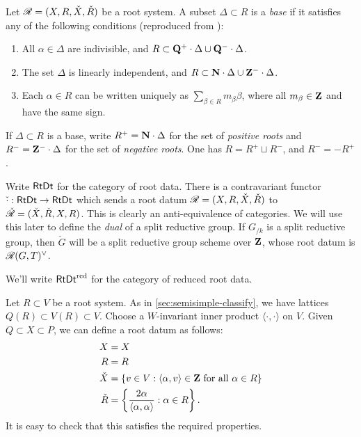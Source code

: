 \begin{definition}
Let $\mathscr{R}=(X,R,\check X,\check R)$ be a root system. A subset $\Delta\subset R$ 
is a \emph{base} if it satisfies any of the following conditions (reproduced 
from \cite[XXI 3.1.5]{sga3-iii}):
\begin{enumerate}
  \item All $\alpha\in \Delta$ are indivisible, and 
    $R\subset \mathbf{Q}^+\cdot\Delta\cup \mathbf{Q}^-\cdot\Delta$. 
  \item The set $\Delta$ is linearly independent, and 
    $R\subset \mathbf{N}\cdot \Delta\cup \mathbf{Z}^-\cdot\Delta$. 
  \item Each $\alpha\in R$ can be written uniquely as 
    $\sum_{\beta\in R} m_\beta \beta$, where all $m_\beta\in \mathbf{Z}$ and have the 
    same sign. 
\end{enumerate}
\end{definition}

If $\Delta\subset R$ is a base, write $R^+=\mathbf{N}\cdot \Delta$ for the set of 
\emph{positive roots} and $R^-=\mathbf{Z}^-\cdot\Delta$ for the set of \emph{negative 
roots}. One has $R=R^+\sqcup R^-$, and $R^-=-R^+$. 

Write $\mathsf{RtDt}$ for the category of root data. There is a contravariant 
functor $\check\cdot:\mathsf{RtDt}\to \mathsf{RtDt}$ which sends a root datum 
$\mathscr{R}=(X,R,\check X,\check R)$ to $\check{\mathscr{R}}=(\check X,\check R,X,R)$. This is 
clearly an anti-equivalence of categories. We will use this later to define 
the \emph{dual} of a split reductive group. If $G_{/k}$ is a split reductive 
group, then $\check G$ will be a split reductive group scheme over $\mathbf{Z}$, whose 
root datum is $\mathscr{R}(G,T)^\vee$. 

We'll write $\mathsf{RtDt}^\mathrm{red}$ for the category of reduced root data. 

\begin{example}
Let $R\subset V$ be a root system. As in \autoref{sec:semisimple-classify}, we 
have lattices $Q(R)\subset V(R)\subset V$. Choose a $W$-invariant inner product 
$\langle\cdot,\cdot\rangle$ on $V$. Given $Q\subset X\subset P$, we can 
define a root datum as follows:
\begin{align*}
  X &= X \\
  R &= R \\
  \check X &= \{v\in V:\langle \alpha,v\rangle\in \mathbf{Z}\text{ for all }\alpha\in R\} \\
  \check R &= \left\{\frac{2\alpha}{\langle \alpha,\alpha\rangle}:\alpha\in R\right\} .
\end{align*}
It is easy to check that this satisfies the required properties. 
\end{example}

